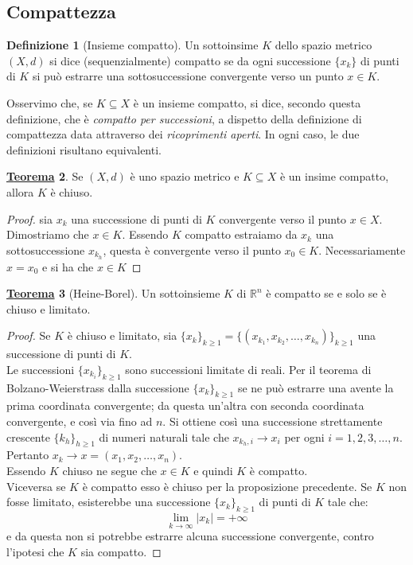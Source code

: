 \documentclass[a4paper,twoside]{article}
\newcommand{\R}{\mathbb{R}}
\theoremstyle{definition}
\newtheorem{theorem}{\color{Red}\underline{\textrm Teorema}}
\newtheorem{definizione}[theorem]{Definizione}
\numberwithin{theorem}{section}
\begin{document}
\subsection{Compattezza}
\begin{definizione}[Insieme compatto]
    Un sottoinsime $K$ dello spazio metrico $(X,d)$ si dice (sequenzialmente) compatto se da ogni successione $\{x_k\}$ di punti di $K$ si può estrarre una sottosuccessione convergente verso un punto $x\in K$.
\end{definizione}
Osservimo che, se $K\subseteq X$ è un insieme compatto, si dice, secondo questa definizione, che è \emph{compatto per successioni}, a dispetto della definizione di compattezza data attraverso dei \emph{ricoprimenti aperti}. In ogni caso, le due definizioni risultano equivalenti.
\begin{theorem}
    Se $(X,d)$ è uno spazio metrico e $K\subseteq X$ è un insime compatto, allora $K$ è chiuso.
\end{theorem}
\begin{proof}
    sia $x_k$ una successione di punti di $K$ convergente verso il punto $x\in X$. Dimostriamo che $x\in K$. Essendo $K$ compatto estraiamo da $x_k$ una sottosuccessione $x_{k_h}$, questa è convergente verso il punto $x_0\in K$. Necessariamente $x=x_0$ e si ha che $x\in K$
\end{proof}
\begin{theorem}[Heine-Borel]
Un sottoinsieme $K$ di $\R^n$ è compatto se e solo se è chiuso e limitato.    
\end{theorem}
\begin{proof}
 Se $K$ è chiuso e limitato, sia $\{x_k\}_{k\geq 1}=\{\left(x_{k_1},x_{k_2},\dots,x_{k_n}\right)\}_{k\geq 1}$ una successione di punti di $K$.\\ Le successioni $\{x_{k_i}\}_{k\geq 1}$ sono successioni limitate di reali. Per il teorema di Bolzano-Weierstrass dalla successione $\{x_k\}_{k\geq 1}$ se ne può estrarre una avente la prima coordinata convergente; da questa un'altra con seconda coordinata convergente, e così via fino ad $n$. Si ottiene così una successione strettamente crescente $\{k_h\}_{h\geq 1}$ di numeri naturali tale che  $x_{k_h,i}\to x_i$ per ogni $i=1,2,3,\dots,n$. Pertanto $x_k\to x=(x_1,x_2,\dots,x_n)$.\\
 Essendo $K$ chiuso ne segue che $x\in K$ e quindi $K$ è compatto.\\ Viceversa se $K$ è compatto esso è chiuso per la proposizione precedente. Se $K$ non fosse limitato, esisterebbe una successione $\{x_k\}_{k\geq 1}$ di punti di $K$ tale che: $$\lim_{k\to\infty}|x_k|=+\infty$$ e da questa non si potrebbe estrarre alcuna successione convergente, contro l'ipotesi che $K$ sia compatto.
\end{proof}
\end{document}
